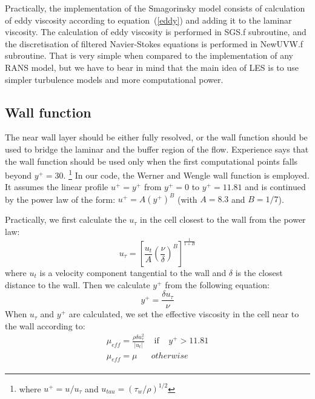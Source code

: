 \documentclass[10pt]{article}
\newcommand*{\tc}{\ttfamily} %
\begin{document}
    Practically, the implementation of the Smagorinsky model 
    consists of calculation of eddy viscosity according to
    equation~(\ref{eddy}) and adding it to the laminar viscosity.
    The calculation of eddy viscosity is performed in {\tc SGS.f}
    subroutine, and the discretisation of filtered Navier-Stokes
    equations is performed in {\tc NewUVW.f} subroutine. That is
    very simple when compared to the implementation of any RANS
    model, but we have to bear in mind that the main idea of LES
    is to use simpler turbulence models and more computational
    power.   

    \subsection{Wall function}

    The near wall layer should be either fully resolved, or the
    wall function should be used to bridge the laminar and the
    buffer region of the flow. Experience says that the wall 
    function should be used only when the first computational 
    points falls beyond $y^+=30$. 
      \footnote{where $u^+=u/u_{\tau}$  
                and  $u_{tau}=(\tau_w/ \rho)^{1/2}$}
    In our code, the Werner and Wengle
    wall function is employed. It assumes the linear profile 
    $u^+=y^+$
    from $y^+=0$ to $y^+=11.81$ and is continued by the power
    law of the form: $u^+=A(y^+)^B$ (with $A=8.3$ and $B=1/7$).

    Practically, we first calculate the $u_{\tau}$ in the cell closest
    to the wall from the power law:
    \begin{equation}
      u_{\tau} = \left[ 
                    \frac{u_t}{A} 
                       \left( \frac{\nu}{\delta}
                       \right)^B
                 \right]^{\frac{1}{1+B}}
    \end{equation}
    where $u_t$ is a velocity component tangential to the wall
    and $\delta$ is the closest distance to the wall.
    Then we calculate $y^+$ from the following equation:
    \begin{equation}
      y^+ = \frac{ \delta u_{\tau} }{ \nu }
    \end{equation}
    When $u_{\tau}$ and $y^+$ are calculated, we set the effective 
    viscosity
    in the cell near to the wall according to:
    \begin{eqnarray}
      \mu_{\mathit{eff}}=\frac{ \rho \delta u_{\tau}^2 }{ |u_t| } 
                \; \; \; \; \mbox{if} \; \; \; \; y^+ > 11.81 \\
      \mu_{\mathit{eff}}=\mu \;\;\;\;\;\; otherwise
    \end{eqnarray}
\end{document}
